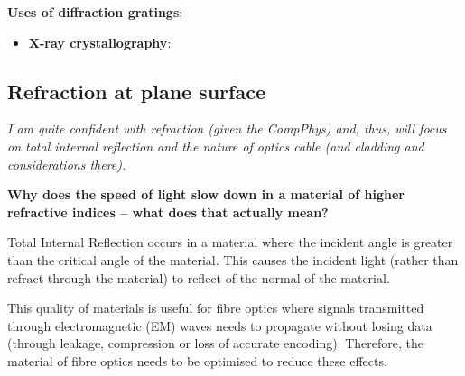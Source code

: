 \documentclass{article}
\begin{document}
\textbf{Uses of diffraction gratings}:
\begin{itemize}
    \item \textbf{X-ray crystallography}: 
\end{itemize}

\subsection{Refraction at plane surface}
\textit{I am quite confident with refraction (given the CompPhys) and, thus, will focus on total internal reflection and the nature of optics cable (and cladding and considerations there).}

\textbf{Why does the speed of light slow down in a material of higher refractive indices -- what does that actually mean?}

Total Internal Reflection occurs in a material where the incident angle is greater than the critical angle of the material. This causes the incident light (rather than refract through the material) to reflect of the normal of the material.


This quality of materials is useful for fibre optics where signals transmitted through electromagnetic (EM) waves needs to propagate without losing data (through leakage, compression or loss of accurate encoding). Therefore, the material of fibre optics needs to be optimised to reduce these effects. 

\end{document}
